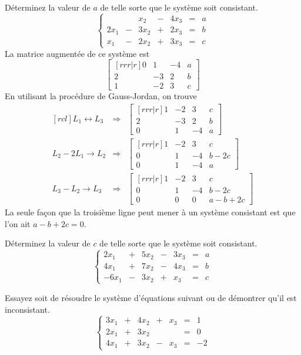 \begin{exemple}
	Déterminez la valeur de $a$ de telle sorte que le système soit consistant.
	\[
	\left\{
	\begin{matrix}
	&& x_2 &-& 4x_3  &=& a \\
	2x_1 &-& 3x_2 &+& 2x_3 &=& b \\
	x_1&-& 2x_2 &+& 3x_3 &=& c
	\end{matrix}
	\right.
	\]
	\solution
	La matrice augmentée de ce système est
	\[
	\begin{bmatrix}[rrr|r]
		0 &1& -4 & a\\
		2 &-3& 2& b\\
		1 & -2 & 3 & c
	\end{bmatrix}
	\]
	En utilisant la procédure de Gauss-Jordan, on trouve
	\[
	\begin{matrix}[rcl]
	L_1 \leftrightarrow L_3
	&\Longrightarrow&
	\begin{bmatrix}[rrr|r]
		1 & -2 & 3 & c\\
		2 &-3& 2& b\\
		0 &1& -4 & a
	\end{bmatrix}
	\\[20pt]
	L_2 - 2L_1 \rightarrow L_2
	&\Longrightarrow&
	\begin{bmatrix}[rrr|r]
		1 & -2 & 3 & c\\
		0 &1& -4& b-2c\\
		0 &1& -4 & a
	\end{bmatrix}
	\\[20pt]
	L_3 - L_2 \rightarrow L_3
	&\Longrightarrow&
	\begin{bmatrix}[rrr|r]
		1 & -2 & 3 & c\\
		0 &1& -4& b-2c\\
		0 &0& 0 & a - b + 2c
	\end{bmatrix}
	\end{matrix}
	\]
	La seule façon que la troisième ligne peut mener à un système consistant est que l'on ait $a-b+2c=0$.
\end{exemple}

\begin{exerciceC}
	Déterminez la valeur de $c$ de telle sorte que le système soit consistant.
	\[
	\left\{
	\begin{matrix}
	2x_1&+& 5x_2 &-& 3x_3  &=& a \\
	4x_1 &+& 7x_2 &-& 4x_3 &=& b \\
	-6x_1&-& 3x_2 &+& x_3 &=& c
	\end{matrix}
	\right.
	\]
\end{exerciceC}
\begin{exerciceC}
	Essayez soit de résoudre le système d'équations suivant ou de démontrer qu'il est inconsistant.
	\[
	\left\{
	\begin{matrix}
	3x_1 &+& 4x_2 &+& x_3 &=& 1 \\
	2x_1 &+& 3x_2 &&  &=& 0 \\
	4x_1 &+& 3x_2 &-& x_3 &=& -2
	\end{matrix}\right.
	\]
\end{exerciceC}

